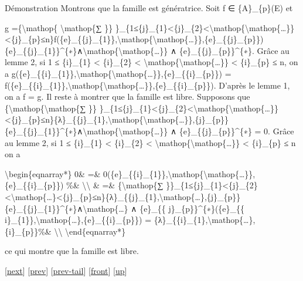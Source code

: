 \documentclass[]{article}
\begin{document}
Démonstration Montrons que la famille est génératrice. Soit f ∈
\{A\}\_\{p\}(E) et

g =\{\textbackslash{}mathop\{ \textbackslash{}mathop\{∑ \}\}
\}\_\{1≤\{j\}\_\{1\}\textless{}\{j\}\_\{2\}\textless{}\textbackslash{}mathop\{\textbackslash{}mathop\{\ldots{}\}\}\textless{}\{j\}\_\{p\}≤n\}f(\{e\}\_\{\{j\}\_\{1\}\},\textbackslash{}mathop\{\textbackslash{}mathop\{\ldots{}\}\},\{e\}\_\{\{j\}\_\{p\}\})\{e\}\_\{\{j\}\_\{1\}\}\^{}\{∗\}∧\textbackslash{}mathop\{\textbackslash{}mathop\{\ldots{}\}\}
∧ \{e\}\_\{\{j\}\_\{p\}\}\^{}\{∗\}. Grâce au lemme 2, si 1 ≤
\{i\}\_\{1\} \textless{} \{i\}\_\{2\} \textless{}
\textbackslash{}mathop\{\textbackslash{}mathop\{\ldots{}\}\} \textless{}
\{i\}\_\{p\} ≤ n, on a
g(\{e\}\_\{\{i\}\_\{1\}\},\textbackslash{}mathop\{\textbackslash{}mathop\{\ldots{}\}\},\{e\}\_\{\{i\}\_\{p\}\})
=
f(\{e\}\_\{\{i\}\_\{1\}\},\textbackslash{}mathop\{\textbackslash{}mathop\{\ldots{}\}\},\{e\}\_\{\{i\}\_\{p\}\}).
D'après le lemme 1, on a f = g. Il reste à montrer que la famille est
libre. Supposons que \{\textbackslash{}mathop\{\textbackslash{}mathop\{∑
\}\}
\}\_\{1≤\{j\}\_\{1\}\textless{}\{j\}\_\{2\}\textless{}\textbackslash{}mathop\{\textbackslash{}mathop\{\ldots{}\}\}\textless{}\{j\}\_\{p\}≤n\}\{λ\}\_\{\{j\}\_\{1\},\textbackslash{}mathop\{\textbackslash{}mathop\{\ldots{}\}\},\{j\}\_\{p\}\}\{e\}\_\{\{j\}\_\{1\}\}\^{}\{∗\}∧\textbackslash{}mathop\{\textbackslash{}mathop\{\ldots{}\}\}
∧ \{e\}\_\{\{j\}\_\{p\}\}\^{}\{∗\} = 0. Grâce au lemme 2, si 1 ≤
\{i\}\_\{1\} \textless{} \{i\}\_\{2\} \textless{}
\textbackslash{}mathop\{\textbackslash{}mathop\{\ldots{}\}\} \textless{}
\{i\}\_\{p\} ≤ n on a

\textbackslash{}begin\{eqnarray*\} 0\& =\&
0(\{e\}\_\{\{i\}\_\{1\}\},\textbackslash{}mathop\{\textbackslash{}mathop\{\ldots{}\}\},\{e\}\_\{\{i\}\_\{p\}\})
\%\& \textbackslash{}\textbackslash{} \& =\& \{\textbackslash{}mathop\{∑
\}\}\_\{1≤\{j\}\_\{1\}\textless{}\{j\}\_\{2\}\textless{}\textbackslash{}mathop\{\ldots{}\}\textless{}\{j\}\_\{p\}≤n\}\{λ\}\_\{\{j\}\_\{1\},\textbackslash{}mathop\{\ldots{}\},\{j\}\_\{p\}\}\{e\}\_\{\{j\}\_\{1\}\}\^{}\{∗\}∧\textbackslash{}mathop\{\ldots{}\}
∧ \{e\}\_\{\{ j\}\_\{p\}\}\^{}\{∗\}(\{e\}\_\{\{
i\}\_\{1\}\},\textbackslash{}mathop\{\ldots{}\},\{e\}\_\{\{i\}\_\{p\}\})
=
\{λ\}\_\{\{i\}\_\{1\},\textbackslash{}mathop\{\ldots{}\},\{i\}\_\{p\}\}\%\&
\textbackslash{}\textbackslash{} \textbackslash{}end\{eqnarray*\}

ce qui montre que la famille est libre.

{[}\href{coursse14.html}{next}{]} {[}\href{coursse12.html}{prev}{]}
{[}\href{coursse12.html\#tailcoursse12.html}{prev-tail}{]}
{[}\href{coursse13.html}{front}{]}
{[}\href{coursch3.html\#coursse13.html}{up}{]}
\end{document}
